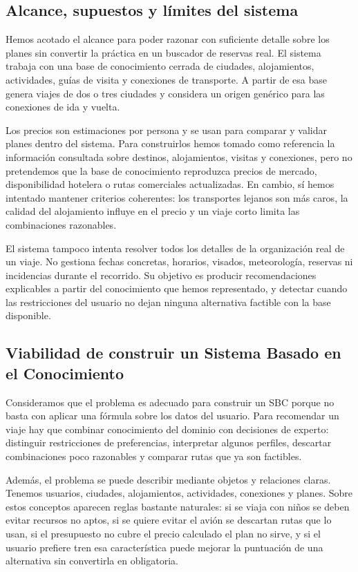 \documentclass[11pt,a4paper]{article}
\begin{document}
\subsection{Alcance, supuestos y l\'imites del sistema}
Hemos acotado el alcance para poder razonar con suficiente detalle sobre los
planes sin convertir la pr\'actica en un buscador de reservas real. El sistema
trabaja con una base de conocimiento cerrada de ciudades, alojamientos,
actividades, gu\'ias de visita y conexiones de transporte. A partir de esa base
genera viajes de dos o tres ciudades y considera un origen gen\'erico para las
conexiones de ida y vuelta.

Los precios son estimaciones por persona y se usan para comparar y validar
planes dentro del sistema. Para construirlos hemos tomado como referencia la
informaci\'on consultada sobre destinos, alojamientos, visitas y conexiones,
pero no pretendemos que la base de conocimiento reproduzca precios de mercado,
disponibilidad hotelera o rutas comerciales actualizadas. En cambio, s\'i
hemos intentado mantener criterios coherentes: los transportes lejanos son
m\'as caros, la calidad del alojamiento influye en el precio y un viaje corto
limita las combinaciones razonables.

El sistema tampoco intenta resolver todos los detalles de la organizaci\'on real
de un viaje. No gestiona fechas concretas, horarios, visados, meteorolog\'ia,
reservas ni incidencias durante el recorrido. Su objetivo es producir
recomendaciones explicables a partir del conocimiento que hemos representado,
y detectar cuando las restricciones del usuario no dejan ninguna alternativa
factible con la base disponible.

\subsection{Viabilidad de construir un Sistema Basado en el Conocimiento}
Consideramos que el problema es adecuado para construir un SBC porque no basta
con aplicar una f\'ormula sobre los datos del usuario. Para recomendar un viaje
hay que combinar conocimiento del dominio con decisiones de experto: distinguir
restricciones de preferencias, interpretar algunos perfiles, descartar
combinaciones poco razonables y comparar rutas que ya son factibles.

Adem\'as, el problema se puede describir mediante objetos y relaciones claras.
Tenemos usuarios, ciudades, alojamientos, actividades, conexiones y planes.
Sobre estos conceptos aparecen reglas bastante naturales: si se viaja con
ni\~nos se deben evitar recursos no aptos, si se quiere evitar el avi\'on se
descartan rutas que lo usan, si el presupuesto no cubre el precio calculado el
plan no sirve, y si el usuario prefiere tren esa caracter\'istica puede mejorar
la puntuaci\'on de una alternativa sin convertirla en obligatoria.
\end{document}
